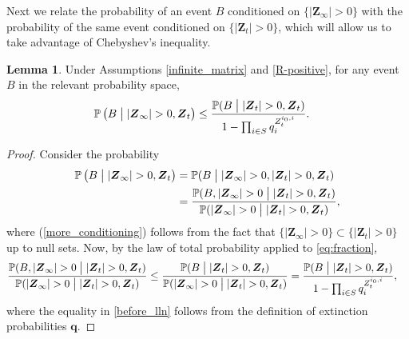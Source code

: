 \documentclass[preprint,3p,12pt]{elsarticle}
\theoremstyle{definition}
\newtheorem{lemma}{Lemma}
\newcommand{\z}[1][i_0, i]{Z_t^{#1}}
\begin{document}
Next we relate the probability of an event $B$ conditioned on $\{ |\boldsymbol{Z}_{\infty}| > 0\} $ with the probability of the same event conditioned on $\{ |\boldsymbol{Z}_t| > 0 \}$, which will allow us to take advantage of Chebyshev's inequality.
\begin{lemma}\label{future_present}
 Under Assumptions \ref{infinite_matrix} and \ref{R-positive}, for any event $B$ in the relevant probability space,
    \begin{align*}
         \mathbb{P} \left(B \bigm| |\boldsymbol{Z}_{\infty}| > 0, \boldsymbol{Z}_t\right) &\le \frac{\mathbb{P}(B \bigm||\boldsymbol{Z}_{t}| > 0, \boldsymbol{Z}_t)}
    {1 - \prod_{i \in S}q_i^{\z}}.
    \end{align*}
\end{lemma}
\begin{proof}
Consider the probability %
\begin{align}
    \mathbb{P}\left(B \bigm| |\boldsymbol{Z}_{\infty}| > 0, \boldsymbol{Z}_t\right) %
    &=\mathbb{P}(B \bigm||\boldsymbol{Z}_{\infty}| > 0,|\boldsymbol{Z}_{t}| > 0, \boldsymbol{Z}_t) \label{more_conditioning} \\
    &=\frac{\mathbb{P}(B,|\boldsymbol{Z}_{\infty}| > 0\bigm||\boldsymbol{Z}_{t}| > 0, \boldsymbol{Z}_t)}
    {\mathbb{P}(|\boldsymbol{Z}_{\infty}| > 0\bigm||\boldsymbol{Z}_{t}| > 0, \boldsymbol{Z}_t)}  \label{eq:fraction},
\end{align}
where (\ref{more_conditioning}) follows from the fact that $\{|\boldsymbol{Z}_{\infty}| > 0\}\subset\{|\boldsymbol{Z}_t| > 0\}$ up to null sets. Now, by the law of total probability %
applied to \eqref{eq:fraction},
\begin{align}
\frac{\mathbb{P}(B,|\boldsymbol{Z}_{\infty}| > 0\bigm||\boldsymbol{Z}_{t}| > 0, \boldsymbol{Z}_t)}
    {\mathbb{P}(|\boldsymbol{Z}_{\infty}| > 0\bigm||\boldsymbol{Z}_{t}| > 0, \boldsymbol{Z}_t)} %
    &\le \frac{\mathbb{P}(B\bigm||\boldsymbol{Z}_{t}| > 0, \boldsymbol{Z}_t)}
    {\mathbb{P}(|\boldsymbol{Z}_{\infty}| > 0\bigm||\boldsymbol{Z}_{t}| > 0, \boldsymbol{Z}_t)} %
    = \frac{\mathbb{P}(B\bigm||\boldsymbol{Z}_{t}| > 0, \boldsymbol{Z}_t)}
    {1 - \prod_{i \in S}q_i^{\z}} \label{before_lln},
\end{align}
where the equality in \eqref{before_lln} follows from the definition of extinction probabilities $\boldsymbol{q}$. 
\end{proof}
\end{document}
